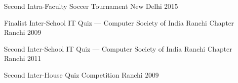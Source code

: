 

    \begin{cvhonours}

      \cvhonour%
          {Second} %
          {Intra-Faculty Soccer Tournament} %
          {New Delhi} %
          {2015} %

    \end{cvhonours}


    \begin{cvhonours}

      \cvhonour%
        {Finalist} %
        {Inter-School IT Quiz --- Computer Society of India Ranchi Chapter} %
        {Ranchi} %
        {2009} %

      \cvhonour%
        {Second} %
        {Inter-School IT Quiz --- Computer Society of India Ranchi Chapter} %
        {Ranchi} %
        {2011} %

      \cvhonour%
        {Second} %
        {Inter-House Quiz Competition} %
        {Ranchi} %
        {2009} %

    \end{cvhonours}

